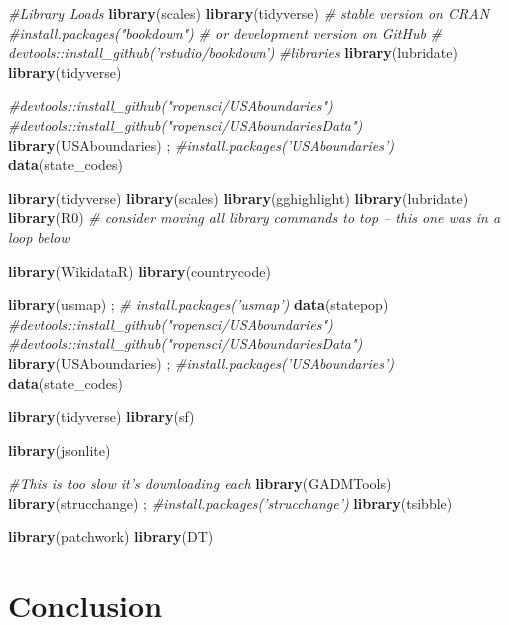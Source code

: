 \documentclass[
]{book}
\newenvironment{Shaded}{\begin{snugshade}}{\end{snugshade}}
\newcommand{\CommentTok}[1]{\textcolor[rgb]{0.56,0.35,0.01}{\textit{#1}}}
\newcommand{\KeywordTok}[1]{\textcolor[rgb]{0.13,0.29,0.53}{\textbf{#1}}}
\newcommand{\NormalTok}[1]{#1}
\begin{document}
\begin{Shaded}
\begin{Highlighting}[]
\CommentTok{#Library Loads}
\KeywordTok{library}\NormalTok{(scales) }
\KeywordTok{library}\NormalTok{(tidyverse)}
\CommentTok{# stable version on CRAN}
\CommentTok{#install.packages("bookdown")}
\CommentTok{# or development version on GitHub}
\CommentTok{# devtools::install_github('rstudio/bookdown')}
\CommentTok{#libraries}
\KeywordTok{library}\NormalTok{(lubridate)}
\KeywordTok{library}\NormalTok{(tidyverse)}

\CommentTok{#devtools::install_github("ropensci/USAboundaries")}
\CommentTok{#devtools::install_github("ropensci/USAboundariesData")}
\KeywordTok{library}\NormalTok{(USAboundaries) ; }\CommentTok{#install.packages('USAboundaries')}
\KeywordTok{data}\NormalTok{(state_codes)}

\KeywordTok{library}\NormalTok{(tidyverse)}
\KeywordTok{library}\NormalTok{(scales)}
\KeywordTok{library}\NormalTok{(gghighlight)}
\KeywordTok{library}\NormalTok{(lubridate)}
\KeywordTok{library}\NormalTok{(R0)  }\CommentTok{# consider moving all library commands to top -- this one was in a loop below}

\KeywordTok{library}\NormalTok{(WikidataR)}
\KeywordTok{library}\NormalTok{(countrycode)}

\KeywordTok{library}\NormalTok{(usmap) ; }\CommentTok{# install.packages('usmap')}
\KeywordTok{data}\NormalTok{(statepop)}
\CommentTok{#devtools::install_github("ropensci/USAboundaries")}
\CommentTok{#devtools::install_github("ropensci/USAboundariesData")}
\KeywordTok{library}\NormalTok{(USAboundaries) ; }\CommentTok{#install.packages('USAboundaries')}
\KeywordTok{data}\NormalTok{(state_codes)}

\KeywordTok{library}\NormalTok{(tidyverse)}
\KeywordTok{library}\NormalTok{(sf)}

\KeywordTok{library}\NormalTok{(jsonlite)}

\CommentTok{#This is too slow it's downloading each}
\KeywordTok{library}\NormalTok{(GADMTools)}
\KeywordTok{library}\NormalTok{(strucchange) ; }\CommentTok{#install.packages('strucchange')}
\KeywordTok{library}\NormalTok{(tsibble)}

\KeywordTok{library}\NormalTok{(patchwork)}
\KeywordTok{library}\NormalTok{(DT)}
\end{Highlighting}
\end{Shaded}

\hypertarget{conclusion}{%
\chapter{Conclusion}\label{conclusion}}

  
\end{document}
